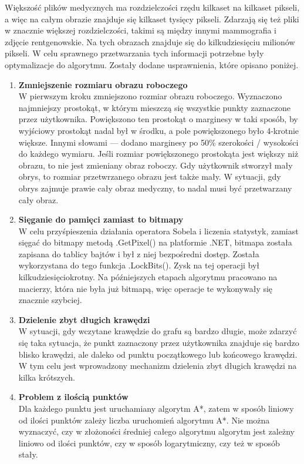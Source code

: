 \documentclass[a4paper,11pt,twoside,openright]{report}
\theoremstyle{definition}
\begin{document}
Większość plików medycznych ma rozdzielczości rzędu kilkaset na kilkaset pikseli,
a więc na całym obrazie znajduje się kilkaset tysięcy pikseli. Zdarzają się też
pliki w znacznie większej rozdzielczości, takimi są między innymi mammografia i
zdjęcie rentgenowskie. Na tych obrazach znajduje się do kilkudziesięciu milionów
pikseli. W celu sprawnego przetwarzania tych informacji potrzebne były optymalizacje
do algorytmu. Zostały dodane usprawnienia, które opisano poniżej.
\begin{enumerate}
\item \textbf {Zmniejszenie rozmiaru obrazu roboczego} \\
W pierwszym kroku zmniejszono rozmiar obrazu roboczego. Wyznaczono najmniejszy
prostokąt, w którym mieszczą się wszystkie punkty zaznaczone przez użytkownika.
Powiększono ten prostokąt o marginesy w taki sposób, by wyjściowy prostokąt nadal
był w środku, a pole powiększonego było 4-krotnie większe. Innymi słowami ---
dodano marginesy po 50\% szerokości / wysokości do każdego wymiaru. Jeśli rozmiar
powiększonego prostokąta jest większy niż obrazu, to nie jest zmieniany obraz roboczy.
Gdy użytkownik stworzył mały obrys, to rozmiar przetwrzanego obrazu jest także mały.
W sytuacji, gdy obrys zajmuje prawie cały obraz medyczny, to nadal musi być
przetwarzany cały obraz.
\item \textbf {Sięganie do pamięci zamiast to bitmapy} \\
W celu przyśpieszenia działania operatora Sobela i liczenia statystyk, zamiast
sięgać do bitmapy metodą .GetPixel() na platformie .NET, bitmapa została zapisana
do tablicy bajtów i był z niej bezpośredni dostęp. Została wykorzystana do tego
funkcja .LockBits(). Zysk na tej operacji był kilkudziesięciokrotny. Na późniejszych
etapach algorytmu pracowano na macierzy, która nie była już bitmapą, więc operacje
te wykonywały się znacznie szybciej.
\item \textbf {Dzielenie zbyt długich krawędzi} \\
W sytuacji, gdy wczytane krawędzie do grafu są bardzo długie, może zdarzyć się
taka sytuacja, że punkt zaznaczony przez użytkownika znajduje się bardzo blisko
krawędzi, ale daleko od punktu początkowego lub końcowego krawędzi. W tym celu
jest wprowadzony mechanizm dzielenia zbyt długich krawędzi na kilka krótszych.
\item \textbf {Problem z ilością punktów} \\
Dla każdego punktu jest uruchamiany algorytm A*, zatem w sposób liniowy od ilości
punktów zależy liczba uruchomień algorytmu A*. Nie można wyznaczyć, czy w złożoności
średniej całego algorytmu algorytm jest zależny liniowo od ilości punktów, czy
w sposób logarytmiczny, czy też w sposób stały.
\end{enumerate}
\end{document}
